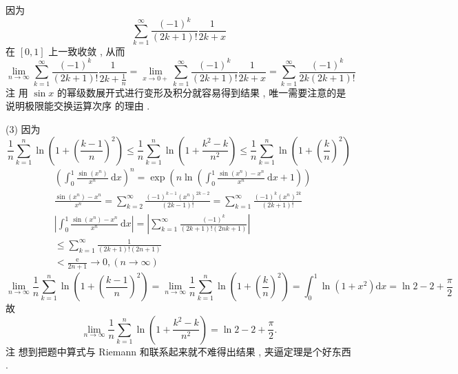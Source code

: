 \documentclass[10pt]{article}
\begin{document}
 因为 
$$
\sum_{k=1}^{\infty} \frac{(-1)^{k}}{(2 k+1) !} \frac{1}{2 k+x}
$$
 在  $[0,1]$  上一致收敛 ,  从而 
$$
\lim _{n \rightarrow \infty} \sum_{k=1}^{\infty} \frac{(-1)^{k}}{(2 k+1) !} \frac{1}{2 k+\frac{1}{n}}=\lim _{x \rightarrow 0+} \sum_{k=1}^{\infty} \frac{(-1)^{k}}{(2 k+1) !} \frac{1}{2 k+x}=\sum_{k=1}^{\infty} \frac{(-1)^{k}}{2 k(2 k+1) !}
$$
 注   用  $\sin x$  的幂级数展开式进行变形及积分就容易得到结果 ,  唯一需要注意的是说明极限能交换运算次序   的理由 .

(3)  因为 
$$
\frac{1}{n} \sum_{k=1}^{n} \ln \left(1+\left(\frac{k-1}{n}\right)^{2}\right) \leqslant \frac{1}{n} \sum_{k=1}^{n} \ln \left(1+\frac{k^{2}-k}{n^{2}}\right) \leqslant \frac{1}{n} \sum_{k=1}^{n} \ln \left(1+\left(\frac{k}{n}\right)^{2}\right)
$$
$$
\begin{aligned}
& \left(\int_{0}^{1} \frac{\sin \left(x^{n}\right)}{x^{n}} \mathrm{~d} x\right)^{n}=\exp \left(n \ln \left(\int_{0}^{1} \frac{\sin \left(x^{n}\right)-x^{n}}{x^{n}} \mathrm{~d} x+1\right)\right) \\
& \frac{\sin \left(x^{n}\right)-x^{n}}{x^{n}}=\sum_{k=2}^{\infty} \frac{(-1)^{k-1}\left(x^{n}\right)^{2 k-2}}{(2 k-1) !}=\sum_{k=1}^{\infty} \frac{(-1)^{k}\left(x^{n}\right)^{2 k}}{(2 k+1) !} \\
& \left|\int_{0}^{1} \frac{\sin \left(x^{n}\right)-x^{n}}{x^{n}} \mathrm{~d} x\right|=\left|\sum_{k=1}^{\infty} \frac{(-1)^{k}}{(2 k+1) !(2 n k+1)}\right| \\
& \leqslant \sum_{k=1}^{\infty} \frac{1}{(2 k+1) !(2 n+1)} \\
& <\frac{\mathrm{e}}{2 n+1} \rightarrow 0,(n \rightarrow \infty) 
\end{aligned}
$$
$$
\lim _{n \rightarrow \infty} \frac{1}{n} \sum_{k=1}^{n} \ln \left(1+\left(\frac{k-1}{n}\right)^{2}\right)=\lim _{n \rightarrow \infty} \frac{1}{n} \sum_{k=1}^{n} \ln \left(1+\left(\frac{k}{n}\right)^{2}\right)=\int_{0}^{1} \ln \left(1+x^{2}\right) \mathrm{d} x=\ln 2-2+\frac{\pi}{2}
$$
 故 
$$
\lim _{n \rightarrow \infty} \frac{1}{n} \sum_{k=1}^{n} \ln \left(1+\frac{k^{2}-k}{n^{2}}\right)=\ln 2-2+\frac{\pi}{2} .
$$
 注   想到把题中算式与  Riemann  和联系起来就不难得出结果 ,  夹逼定理是个好东西 .
\end{document}
